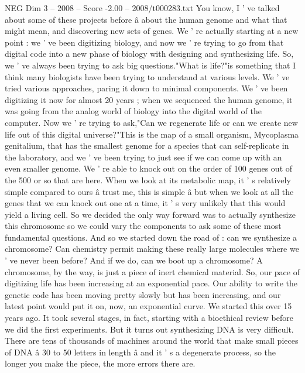 \begin{textsample}{NEG Dim 3 – 2008 – Score -2.00 – 2008/t000283.txt}  \label{ex:f3_neg_020}
You know, I ' ve talked about some of these projects before â about the human genome and what that might mean, and discovering new sets of genes.
We ' re actually starting at a new point : we ' ve been digitizing biology, and now we ' re trying to go from that digital code into a new phase of biology with designing and synthesizing life.
So, we ' ve always been trying to ask big questions."What is life?"is something that I think many biologists have been trying to understand at various levels.
We ' ve tried various approaches, paring it down to minimal components.
We ' ve been digitizing it now for almost 20 years ; when we sequenced the human genome, it was going from the analog world of biology into the digital world of the computer.
Now we ' re trying to ask,"Can we regenerate life or can we create new life out of this digital universe?"This is the map of a small organism, Mycoplasma genitalium, that has the smallest genome for a species that can self-replicate in the laboratory, and we ' ve been trying to just see if we can come up with an even smaller genome.
We ' re able to knock out on the order of 100 genes out of the 500 or so that are here.
When we look at its metabolic map, it ' s relatively simple compared to ours â trust me, this is simple â but when we look at all the genes that we can knock out one at a time, it ' s very unlikely that this would yield a living cell.
So we decided the only way forward was to actually synthesize this chromosome so we could vary the components to ask some of these most fundamental questions.
And so we started down the road of : can we synthesize a chromosome?
Can chemistry permit making these really large molecules where we ' ve never been before?
And if we do, can we boot up a chromosome?
A chromosome, by the way, is just a piece of inert chemical material.
So, our pace of digitizing life has been increasing at an exponential pace.
Our ability to write the genetic code has been moving pretty slowly but has been increasing, and our latest point would put it on, now, an exponential curve.
We started this over 15 years ago.
It took several stages, in fact, starting with a bioethical review before we did the first experiments.
But it turns out synthesizing DNA is very difficult.
There are tens of thousands of machines around the world that make small pieces of DNA â 30 to 50 letters in length â and it ' s a degenerate process, so the longer you make the piece, the more errors there are.

\end{textsample}
